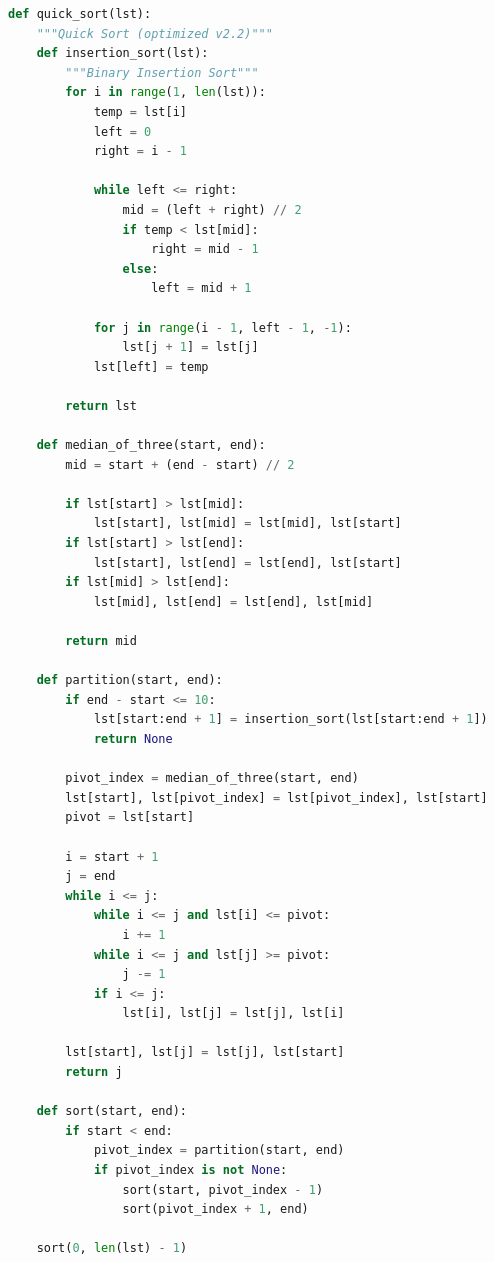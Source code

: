 
\begin{lstlisting}[language=Python]
def quick_sort(lst):
    """Quick Sort (optimized v2.2)"""
    def insertion_sort(lst):
        """Binary Insertion Sort"""
        for i in range(1, len(lst)):
            temp = lst[i]
            left = 0
            right = i - 1

            while left <= right:
                mid = (left + right) // 2
                if temp < lst[mid]:
                    right = mid - 1
                else:
                    left = mid + 1

            for j in range(i - 1, left - 1, -1):
                lst[j + 1] = lst[j]
            lst[left] = temp
        
        return lst
    
    def median_of_three(start, end):
        mid = start + (end - start) // 2

        if lst[start] > lst[mid]:
            lst[start], lst[mid] = lst[mid], lst[start]
        if lst[start] > lst[end]:
            lst[start], lst[end] = lst[end], lst[start]
        if lst[mid] > lst[end]:
            lst[mid], lst[end] = lst[end], lst[mid]
        
        return mid

    def partition(start, end):
        if end - start <= 10:
            lst[start:end + 1] = insertion_sort(lst[start:end + 1])
            return None

        pivot_index = median_of_three(start, end)
        lst[start], lst[pivot_index] = lst[pivot_index], lst[start]
        pivot = lst[start]

        i = start + 1
        j = end
        while i <= j:
            while i <= j and lst[i] <= pivot:
                i += 1
            while i <= j and lst[j] >= pivot:
                j -= 1
            if i <= j:
                lst[i], lst[j] = lst[j], lst[i]
        
        lst[start], lst[j] = lst[j], lst[start]
        return j

    def sort(start, end):
        if start < end:
            pivot_index = partition(start, end)
            if pivot_index is not None:
                sort(start, pivot_index - 1)
                sort(pivot_index + 1, end)

    sort(0, len(lst) - 1)
\end{lstlisting}

\newpage

